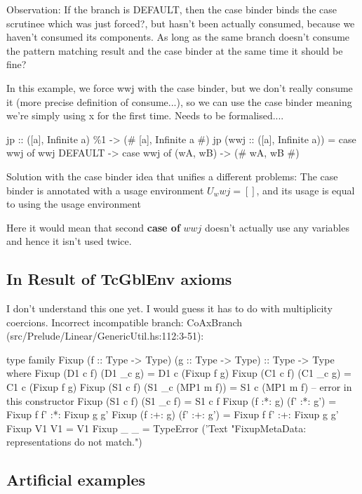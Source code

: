 \documentclass[a4paper, draft]{article}
\begin{document}
Observation: If the branch is DEFAULT, then the case binder binds the case
scrutinee which was just forced?, but hasn't been actually consumed, because we
haven't consumed its components. As long as the same branch doesn't consume the
pattern matching result and the case binder at the same time it should be fine?

In this example, we force wwj with the case binder, but we don't really
consume it (more precise definition of consume...), so we can use the case
binder meaning we're simply using x for the first time. Needs to be
formalised....

\begin{code}
jp :: ([a], Infinite a) \%1 -> (# [a], Infinite a #)
jp (wwj :: ([a], Infinite a)) =
    case wwj of wwj {
        DEFAULT -> case wwj of { (wA, wB) -> (# wA, wB #) }
    }
\end{code}

Solution with the case binder idea that unifies a different problems:
The case binder is annotated with a usage environment $U_wwj = []$, and its
usage is equal to using the usage environment

Here it would mean that second \textbf{case of} $wwj$ doesn't actually use any
variables and hence it isn't used twice.


\subsection{In Result of TcGblEnv axioms}

I don't understand this one yet. I would guess it has to do with multiplicity
coercions. Incorrect incompatible branch: CoAxBranch (src/Prelude/Linear/GenericUtil.hs:112:3-51):
\begin{code}
type family Fixup (f :: Type -> Type) (g :: Type -> Type) :: Type -> Type where
  Fixup (D1 c f) (D1 _c g) = D1 c (Fixup f g)
  Fixup (C1 c f) (C1 _c g) = C1 c (Fixup f g)
  Fixup (S1 c f) (S1 _c (MP1 m f)) = S1 c (MP1 m f) -- error in this constructor
  Fixup (S1 c f) (S1 _c f) = S1 c f
  Fixup (f :*: g) (f' :*: g') = Fixup f f' :*: Fixup g g'
  Fixup (f :+: g) (f' :+: g') = Fixup f f' :+: Fixup g g'
  Fixup V1 V1 = V1
  Fixup _ _ = TypeError ('Text "FixupMetaData: representations do not match.")
\end{code}


\subsection{Artificial examples}
\end{document}
